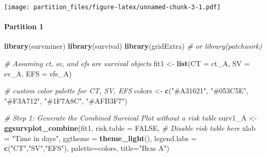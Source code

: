 \documentclass[
]{article}
\newenvironment{Shaded}{\begin{snugshade}}{\end{snugshade}}
\newcommand{\AttributeTok}[1]{\textcolor[rgb]{0.13,0.29,0.53}{#1}}
\newcommand{\CommentTok}[1]{\textcolor[rgb]{0.56,0.35,0.01}{\textit{#1}}}
\newcommand{\ConstantTok}[1]{\textcolor[rgb]{0.56,0.35,0.01}{#1}}
\newcommand{\FunctionTok}[1]{\textcolor[rgb]{0.13,0.29,0.53}{\textbf{#1}}}
\newcommand{\NormalTok}[1]{#1}
\newcommand{\OtherTok}[1]{\textcolor[rgb]{0.56,0.35,0.01}{#1}}
\newcommand{\StringTok}[1]{\textcolor[rgb]{0.31,0.60,0.02}{#1}}
\begin{document}
\texttt{[image: partition\_files/figure-latex/unnamed-chunk-3-1.pdf]}

\hypertarget{partition-1}{%
\paragraph{Partition 1}\label{partition-1}}

\begin{Shaded}
\begin{Highlighting}[]
\FunctionTok{library}\NormalTok{(survminer)}
\FunctionTok{library}\NormalTok{(survival)}
\FunctionTok{library}\NormalTok{(gridExtra) }\CommentTok{\# or library(patchwork)}

\CommentTok{\# Assuming ct, sv, and efs are survival objects}
\NormalTok{fit1 }\OtherTok{\textless{}{-}} \FunctionTok{list}\NormalTok{(}\AttributeTok{CT =}\NormalTok{ ct\_A, }\AttributeTok{SV =}\NormalTok{ sv\_A, }\AttributeTok{EFS =}\NormalTok{ efs\_A)}

\CommentTok{\# custom color palette for CT, SV, EFS}
\NormalTok{colors }\OtherTok{\textless{}{-}} \FunctionTok{c}\NormalTok{(}\StringTok{"\#A31621"}\NormalTok{, }\StringTok{"\#053C5E"}\NormalTok{, }\StringTok{"\#F3A712"}\NormalTok{, }\StringTok{"\#1F7A8C"}\NormalTok{, }\StringTok{"\#AFB3F7"}\NormalTok{)}

\CommentTok{\# Step 1: Generate the Combined Survival Plot without a risk table}
\NormalTok{surv1\_A }\OtherTok{\textless{}{-}} \FunctionTok{ggsurvplot\_combine}\NormalTok{(fit1,}
                        \AttributeTok{risk.table =} \ConstantTok{FALSE}\NormalTok{,  }\CommentTok{\# Disable risk table here}
                        \AttributeTok{xlab =} \StringTok{"Time in days"}\NormalTok{,}
                        \AttributeTok{ggtheme =} \FunctionTok{theme\_light}\NormalTok{(),}
                        \AttributeTok{legend.labs =} \FunctionTok{c}\NormalTok{(}\StringTok{"CT"}\NormalTok{,}\StringTok{"SV"}\NormalTok{,}\StringTok{"EFS"}\NormalTok{),}
                        \AttributeTok{palette=}\NormalTok{colors,}
                        \AttributeTok{title=}\StringTok{"Bras A"}\NormalTok{)}


\end{Highlighting}
\end{Shaded}
\end{document}
